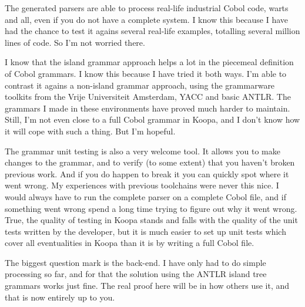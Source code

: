 \documentclass[a4paper]{article}
\begin{document}
The generated parsers are able to process real-life industrial Cobol code, warts and all, even if you do not have a complete system. I know this because I have had the chance to test it agains several real-life examples, totalling several million lines of code. So I'm not worried there.

I know that the island grammar approach helps a lot in the piecemeal definition of Cobol grammars. I know this because I have tried it both ways. I'm able to contrast it agains a non-island grammar approach, using the grammarware toolkits from the Vrije Universiteit Amsterdam, YACC and basic ANTLR. The grammars I made in these environments have proved much harder to maintain. Still, I'm not even close to a full Cobol grammar in Koopa, and I don't know how it will cope with such a thing. But I'm hopeful.

The grammar unit testing is also a very welcome tool. It allows you to make changes to the grammar, and to verify (to some extent) that you haven't broken previous work. And if you do happen to break it you can quickly spot where it went wrong. My experiences with previous toolchains were never this nice. I would always have to run the complete parser on a complete Cobol file, and if something went wrong spend a long time trying to figure out why it went wrong. True, the quality of testing in Koopa stands and falls with the quality of the unit tests written by the developer, but it is much easier to set up unit tests which cover all eventualities in Koopa than it is by writing a full Cobol file.

The biggest question mark is the back-end. I have only had to do simple processing so far, and for that the solution using the ANTLR island tree grammars works just fine. The real proof here will be in how others use it, and that is now entirely up to you.





\end{document}
